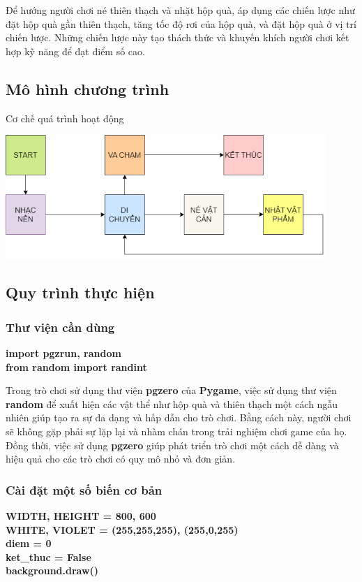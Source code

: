\documentclass[a4paper]{article}
\begin{document}
Để hướng người chơi né thiên thạch và nhặt hộp quà, áp dụng các chiến
lược như đặt hộp quà gần thiên thạch, tăng tốc độ rơi của hộp quà, và
đặt hộp quà ở vị trí chiến lược. Những chiến lược này tạo thách thức và
khuyến khích người chơi kết hợp kỹ năng để đạt điểm số cao.

\subsection{Mô hình chương trình}
Cơ chế quá trình hoạt động

\includegraphics[width=4.79722in,height=1.84583in]{image11.png}
\newpage
\subsection{Quy trình thực hiện}
\subsubsection{Thư viện cần dùng}
\textbf{import pgzrun, random}\\
\textbf{from random import randint}

Trong trò chơi sử dụng thư viện \textbf{pgzero} của \textbf{Pygame}, việc sử dụng thư viện \textbf{random} để xuất hiện các vật thể như hộp quà và thiên thạch một cách ngẫu nhiên giúp tạo ra sự đa dạng và hấp dẫn cho trò chơi. Bằng
cách này, người chơi sẽ không gặp phải sự lặp lại và nhàm chán trong
trải nghiệm chơi game của họ. Đồng thời, việc sử dụng \textbf{pgzero} giúp phát
triển trò chơi một cách dễ dàng và hiệu quả cho các trò chơi có quy mô
nhỏ và đơn giản.
\subsubsection{Cài đặt một số biến cơ bản}
\textbf{WIDTH, HEIGHT = 800, 600}\\
\textbf{WHITE, VIOLET = (255,255,255), (255,0,255)}\\ 
\textbf{diem = 0}\\
\textbf{ket\_thuc = False}\\
\textbf{background.draw()}
\end{document}
